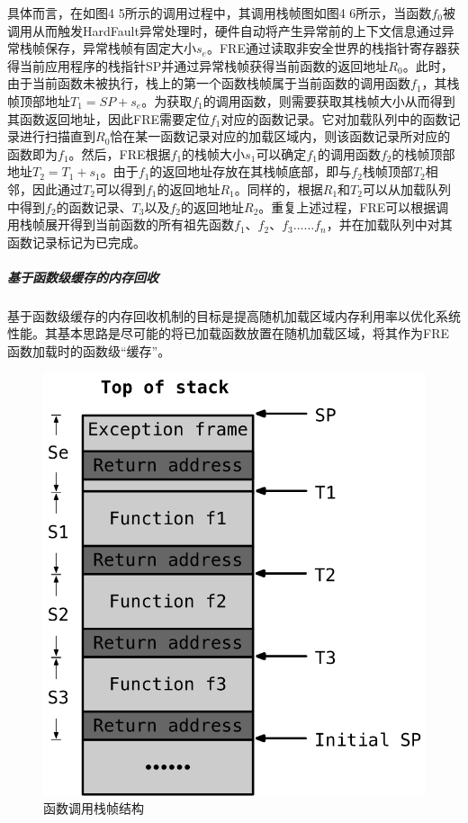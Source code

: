 \documentclass[12pt,a4paper]{ctexart}
\numberwithin{figure}{section}
\begin{document}
\par 具体而言，在如图4 5所示的调用过程中，其调用栈帧图如图4 6所示，当函数$f_0$被调用从而触发HardFault异常处理时，硬件自动将产生异常前的上下文信息通过异常栈帧保存，异常栈帧有固定大小$s_e$。FRE通过读取非安全世界的栈指针寄存器获得当前应用程序的栈指针SP并通过异常栈帧获得当前函数的返回地址$R_0$。此时，由于当前函数未被执行，栈上的第一个函数栈帧属于当前函数的调用函数$f_1$，其栈帧顶部地址$T_1=SP+s_e$。为获取$f_1$的调用函数，则需要获取其栈帧大小从而得到其函数返回地址，因此FRE需要定位$f_1$对应的函数记录。它对加载队列中的函数记录进行扫描直到$R_0$恰在某一函数记录对应的加载区域内，则该函数记录所对应的函数即为$f_1$。然后，FRE根据$f_1$的栈帧大小$s_1$可以确定$f_1$的调用函数$f_2$的栈帧顶部地址$T_2=T_1+s_1$。由于$f_1$的返回地址存放在其栈帧底部，即与$f_2$栈帧顶部$T_2$相邻，因此通过$T_2$可以得到$f_1$的返回地址$R_1$。同样的，根据$R_1$和$T_2$可以从加载队列中得到$f_2$的函数记录、$T_3$以及$f_2$的返回地址$R_2$。重复上述过程，FRE可以根据调用栈帧展开得到当前函数的所有祖先函数$f_1、f_2、f_3……f_n$，并在加载队列中对其函数记录标记为已完成。
\subparagraph{基于函数级缓存的内存回收}
\par 基于函数级缓存的内存回收机制的目标是提高随机加载区域内存利用率以优化系统性能。其基本思路是尽可能的将已加载函数放置在随机加载区域，将其作为FRE函数加载时的函数级“缓存”。
\begin{figure}[h]
    \centering
    \includegraphics[scale=0.7]{graph/stackFrame.png}
    \caption{函数调用栈帧结构}
\end{figure}
\end{document}
